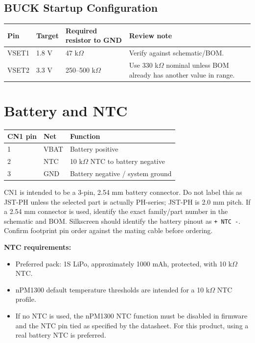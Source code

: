 \documentclass[11pt,a4paper]{article}
\begin{document}
\subsection{BUCK Startup Configuration}

\begin{table}[h]
\small
\begin{tabularx}{\textwidth}{lllL}
\toprule
\textbf{Pin} & \textbf{Target} & \textbf{Required resistor to GND} & \textbf{Review note}\\
\midrule
VSET1 & 1.8 V & 47 k$\Omega$ & Verify against schematic/BOM.\\
VSET2 & 3.3 V & 250--500 k$\Omega$ & Use 330 k$\Omega$ nominal unless BOM already has another value in range.\\
\bottomrule
\end{tabularx}
\end{table}

\section{Battery and NTC}

\begin{table}[h]
\small
\begin{tabularx}{\textwidth}{lll}
\toprule
\textbf{CN1 pin} & \textbf{Net} & \textbf{Function}\\
\midrule
1 & VBAT & Battery positive\\
2 & NTC & 10 k$\Omega$ NTC to battery negative\\
3 & GND & Battery negative / system ground\\
\bottomrule
\end{tabularx}
\end{table}

CN1 is intended to be a 3-pin, 2.54 mm battery connector. Do not label this as JST-PH unless the selected part is actually PH-series; JST-PH is 2.0 mm pitch. If a 2.54 mm connector is used, identify the exact family/part number in the schematic and BOM. Silkscreen should identify the battery pinout as \texttt{+ NTC -}. Confirm footprint pin order against the mating cable before ordering.

\textbf{NTC requirements:}
\begin{itemize}
  \item Preferred pack: 1S LiPo, approximately 1000 mAh, protected, with 10 k$\Omega$ NTC.
  \item nPM1300 default temperature thresholds are intended for a 10 k$\Omega$ NTC profile.
  \item If no NTC is used, the nPM1300 NTC function must be disabled in firmware and the NTC pin tied as specified by the datasheet. For this product, using a real battery NTC is preferred.
\end{itemize}
\end{document}

